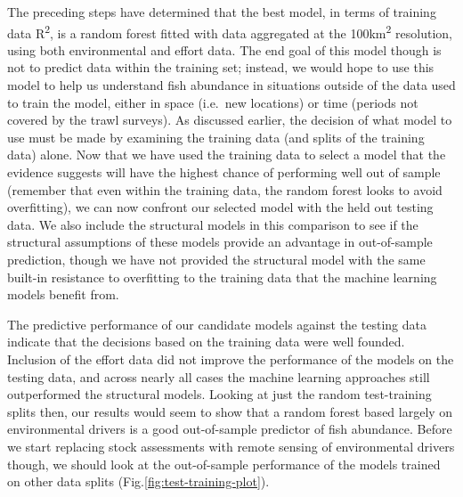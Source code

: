 \documentclass[twoside,12pt,final]{ucthesis-CA2012}
\begin{document}
\begin{ucmainmatter}
The preceding steps have determined that the best model, in terms of
training data R\textsuperscript{2}, is a random forest fitted with data
aggregated at the 100km\textsuperscript{2} resolution, using both
environmental and effort data. The end goal of this model though is not
to predict data within the training set; instead, we would hope to use
this model to help us understand fish abundance in situations outside of
the data used to train the model, either in space (i.e.~new locations)
or time (periods not covered by the trawl surveys). As discussed
earlier, the decision of what model to use must be made by examining the
training data (and splits of the training data) alone. Now that we have
used the training data to select a model that the evidence suggests will
have the highest chance of performing well out of sample (remember that
even within the training data, the random forest looks to avoid
overfitting), we can now confront our selected model with the held out
testing data. We also include the structural models in this comparison
to see if the structural assumptions of these models provide an
advantage in out-of-sample prediction, though we have not provided the
structural model with the same built-in resistance to overfitting to the
training data that the machine learning models benefit from.

The predictive performance of our candidate models against the testing
data indicate that the decisions based on the training data were well
founded. Inclusion of the effort data did not improve the performance of
the models on the testing data, and across nearly all cases the machine
learning approaches still outperformed the structural models. Looking at
just the random test-training splits then, our results would seem to
show that a random forest based largely on environmental drivers is a
good out-of-sample predictor of fish abundance. Before we start
replacing stock assessments with remote sensing of environmental drivers
though, we should look at the out-of-sample performance of the models
trained on other data splits (Fig.\ref{fig:test-training-plot}).


\end{ucmainmatter}
\end{document}
